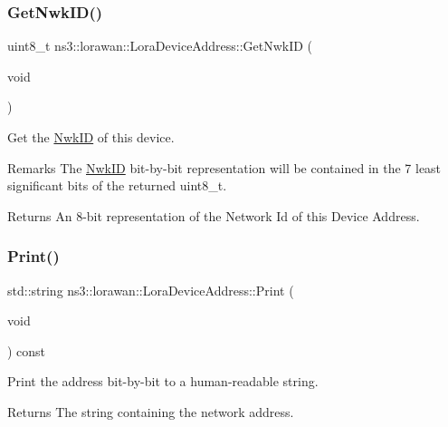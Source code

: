 \subsubsection{\texorpdfstring{Get\+Nwk\+I\+D()}{GetNwkID()}}
{\footnotesize\ttfamily uint8\+\_\+t ns3\+::lorawan\+::\+Lora\+Device\+Address\+::\+Get\+Nwk\+ID (\begin{DoxyParamCaption}\item[{void}]{ }\end{DoxyParamCaption})}

Get the \hyperlink{classns3_1_1lorawan_1_1NwkID}{Nwk\+ID} of this device.

\begin{DoxyRemark}{Remarks}
The \hyperlink{classns3_1_1lorawan_1_1NwkID}{Nwk\+ID} bit-\/by-\/bit representation will be contained in the 7 least significant bits of the returned uint8\+\_\+t.
\end{DoxyRemark}
\begin{DoxyReturn}{Returns}
An 8-\/bit representation of the Network Id of this Device Address. 
\end{DoxyReturn}
\mbox{\label{classns3_1_1lorawan_1_1LoraDeviceAddress_a32bddd9c89d98e48c99b4dfef8cdf4d5}} 
\subsubsection{\texorpdfstring{Print()}{Print()}}
{\footnotesize\ttfamily std\+::string ns3\+::lorawan\+::\+Lora\+Device\+Address\+::\+Print (\begin{DoxyParamCaption}\item[{void}]{ }\end{DoxyParamCaption}) const}

Print the address bit-\/by-\/bit to a human-\/readable string.

\begin{DoxyReturn}{Returns}
The string containing the network address. 
\end{DoxyReturn}
\mbox{\label{classns3_1_1lorawan_1_1LoraDeviceAddress_a8a9441f5c1d4ecce4b762e5fee408f53}} 
